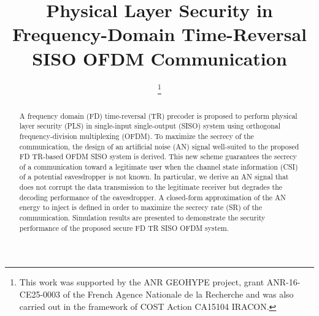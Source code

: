 \documentclass[conference]{IEEEtran}
\begin{document}
\title{Physical Layer Security in Frequency-Domain Time-Reversal SISO OFDM Communication \\
{}
}

\author{
\thanks{This work was supported by the ANR GEOHYPE project, grant ANR-16-CE25-0003 of the French Agence Nationale de la Recherche and was also carried out in the framework of COST Action CA15104 IRACON.}}

\maketitle


\begin{abstract}
A frequency domain (FD) time-reversal (TR) precoder is proposed to perform physical layer security (PLS) in single-input single-output (SISO) system using orthogonal frequency-division multiplexing (OFDM). To maximize the secrecy of the communication, the design of an artificial noise (AN) signal well-suited to the proposed FD TR-based OFDM SISO system is derived. This new scheme guarantees the secrecy of a communication toward a legitimate user when the channel state information (CSI) of a potential eavesdropper is not known. In particular, we derive an AN signal that does not corrupt the data transmission to the legitimate receiver but degrades the decoding performance of the eavesdropper. A closed-form approximation of the AN energy to inject is defined in order to maximize the secrecy rate (SR) of the communication. Simulation results are presented to demonstrate the security performance of the proposed secure FD TR SISO OFDM system.
\end{abstract}
\end{document}
